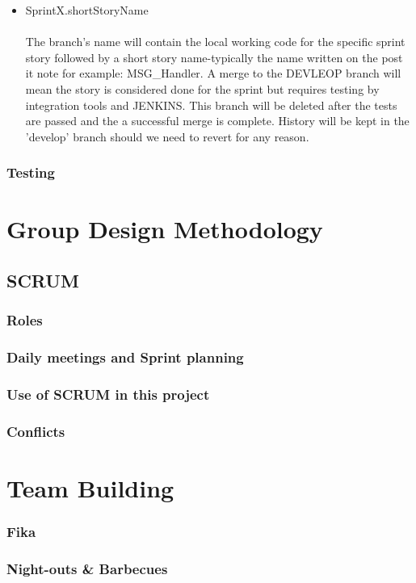 \documentclass[11pt]{report}
\begin{document}
\begin{itemize}
\item SprintX.shortStoryName\\ \\
The branch's name will contain the local working code for the specific sprint story followed by a short story name-typically the name written on the post it note for example: MSG\_Handler. A merge to the DEVLEOP branch will mean the story is considered done for the sprint but requires testing by integration tools and JENKINS. This branch will be deleted after the tests are passed and the a successful merge is complete. History will be kept in the 'develop' branch should we need to revert for any reason. 
\end{itemize}



\subsection{Testing}
\chapter{Group Design Methodology}
\section{SCRUM}
\subsection{Roles}
\subsection{Daily meetings and Sprint planning}
\subsection{Use of SCRUM in this project}
\subsection{Conflicts}
\chapter{Team Building}
\subsection{Fika}
\subsection{Night-outs \& Barbecues}
\end{document}
